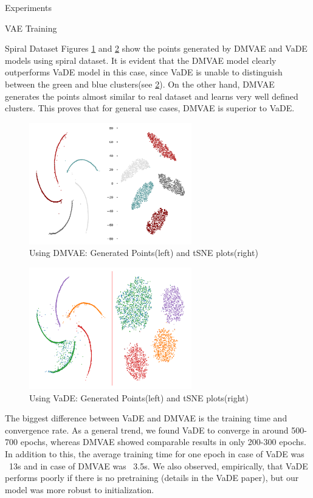\documentclass{article}
\begin{document}
\begin{psection}{Experiments}
\begin{psubsection}{VAE Training}
\begin{pssubsection}{Spiral Dataset}
			Figures \ref{fig:dmvae_spiral_sampled} and \ref{fig:vade_spiral_sampled} show the points generated by DMVAE and VaDE models using spiral dataset. It is evident that the DMVAE model clearly outperforms VaDE model in this case, since VaDE is unable to distinguish between the green and blue clusters(see \ref{fig:vade_spiral_sampled}). On the other hand, DMVAE generates the points almost similar to real dataset and learns very well defined clusters. This proves that for general use cases, DMVAE is superior to VaDE.
			\begin{figure}[H]
				\centering
				\includegraphics[height=200px]{includes/plots/dmvae/spiral/sampled.png}
				\caption{Using DMVAE: Generated Points(left) and tSNE plots(right)}
				\label{fig:dmvae_spiral_sampled}
			\end{figure}
			\begin{figure}[H]
				\centering
				\includegraphics[height=200px]{includes/plots/vade/spiral/sampled.png}
				\caption{Using VaDE: Generated Points(left) and tSNE plots(right)}
				\label{fig:vade_spiral_sampled}
			\end{figure}
		\end{pssubsection}

		The biggest difference between VaDE and DMVAE is the training time and convergence rate. As a general trend, we found VaDE to converge in around 500-700 epochs, whereas DMVAE showed comparable results in only 200-300 epochs. In addition to this, the average training time for one epoch in case of VaDE was ~13s and in case of DMVAE was ~3.5s. We also observed, empirically, that VaDE performs poorly if there is no pretraining (details in the VaDE paper), but our model was more robust to initialization.


\end{psubsection}
\end{psection}
\end{document}
